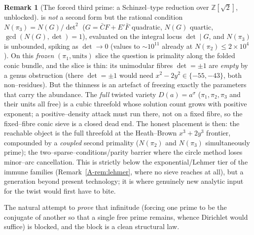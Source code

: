 \documentclass[11pt]{article}
\theoremstyle{definition}
\newtheorem{remark}[theorem]{Remark}
\begin{document}
\begin{remark}[{The forced third prime: a Schinzel--type reduction over $\mathbb{Z}[\sqrt2]$, unblocked}]
is \emph{not} a second form but the rational condition $N(\pi_3)=N(G)/\det^2$ ($G=\bar CF+E'\bar F$ quadratic,
$N(G)$ quartic, $\gcd(N(G),\det)=1$), evaluated on the integral locus $\det\mid G$, and $N(\pi_3)$ is unbounded,
spiking as $\det\to0$ (values to ${\sim}10^{11}$ already at $N(\pi_2)\le2\times10^4$). On this \emph{frozen}
$(\pi_1,\text{units})$ slice the question is primality along the folded conic bundle, and the slice is thin: its
unimodular fibres $\det=\pm1$ are \emph{empty} by a genus obstruction (there $\det=\pm1$ would need
$x^2-2y^2\in\{-55,-43\}$, both non--residues). But the thinness is an artefact of freezing exactly the parameters
that carry the abundance. The \emph{full} twisted variety $D(a)=a^\sigma$ ($\pi_1,\pi_2,\pi_3$ and their units all
free) is a cubic threefold whose solution count grows with positive exponent; a positive--density attack must run
there, not on a fixed fibre, so the fixed--fibre conic sieve is a closed dead end. The honest placement is then: the
reachable object is the full threefold at the Heath--Brown $x^3+2y^3$ frontier, compounded by a \emph{coupled} second
primality ($N(\pi_2)$ and $N(\pi_3)$ simultaneously prime); the two--sparse--conditions/parity barrier where the
circle method loses minor--arc cancellation. This is strictly below the exponential/Lehmer tier of the immune
families (Remark~\ref{A-rem:lehmer}, where no sieve reaches at all), but a generation beyond present technology; it is
where genuinely new analytic input for the twist would first have to bite.
\end{remark}

The natural attempt to \emph{prove} that infinitude (forcing one prime to be the conjugate of another
so that a single free prime remains, whence Dirichlet would suffice) is blocked, and the block is a
clean structural law.
\end{document}
